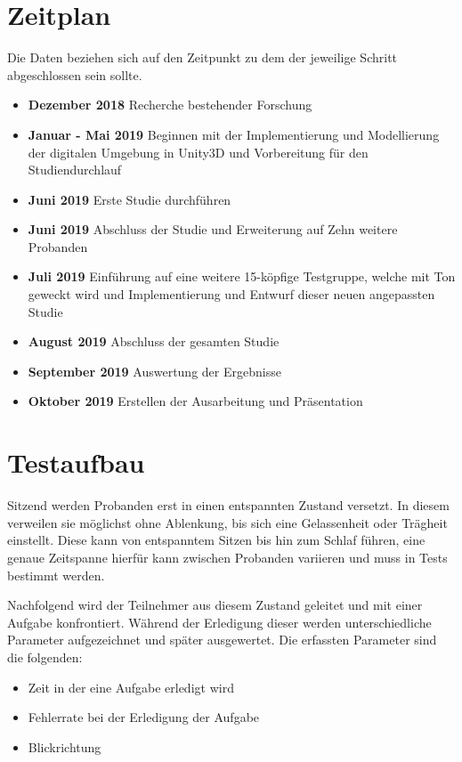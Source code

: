 \section{Zeitplan}
Die Daten beziehen sich auf den Zeitpunkt zu dem der jeweilige Schritt abgeschlossen sein sollte.
\begin{itemize}
	\item \textbf{Dezember 2018} Recherche bestehender Forschung
	\item \textbf{Januar - Mai 2019} Beginnen mit der Implementierung und Modellierung der digitalen Umgebung in Unity3D und Vorbereitung für den Studiendurchlauf
	\item \textbf{Juni 2019} Erste Studie durchführen
	\item \textbf{Juni 2019} Abschluss der Studie und Erweiterung auf Zehn weitere Probanden
	\item \textbf{Juli 2019} Einführung auf eine weitere 15-köpfige Testgruppe, welche mit Ton geweckt wird und Implementierung und Entwurf dieser neuen angepassten Studie
	\item \textbf{August 2019} Abschluss der gesamten Studie
	\item \textbf{September 2019} Auswertung der Ergebnisse
	\item \textbf{Oktober 2019} Erstellen der Ausarbeitung und Präsentation
\end{itemize}

\section{Testaufbau}
Sitzend werden Probanden erst in einen entspannten Zustand versetzt. In diesem verweilen sie möglichst ohne Ablenkung, bis sich eine Gelassenheit oder Trägheit einstellt. Diese kann von entspanntem Sitzen bis hin zum Schlaf führen, eine genaue Zeitspanne hierfür kann zwischen Probanden variieren und muss in Tests bestimmt werden.

Nachfolgend wird der Teilnehmer aus diesem Zustand geleitet und mit einer Aufgabe konfrontiert. Während der Erledigung dieser werden unterschiedliche Parameter aufgezeichnet und später ausgewertet. Die erfassten Parameter sind die folgenden:

\begin{itemize}
	\item Zeit in der eine Aufgabe erledigt wird
	\item Fehlerrate bei der Erledigung der Aufgabe
	\item Blickrichtung
\end{itemize}

